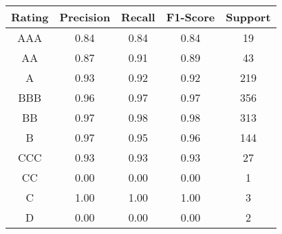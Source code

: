 \footnotesize
\begin{tabular}{ccccc}
\toprule
Rating & Precision & Recall & F1-Score & Support \\
\midrule
AAA & 0.84 & 0.84 & 0.84 & 19 \\
AA & 0.87 & 0.91 & 0.89 & 43 \\
A & 0.93 & 0.92 & 0.92 & 219 \\
BBB & 0.96 & 0.97 & 0.97 & 356 \\
BB & 0.97 & 0.98 & 0.98 & 313 \\
B & 0.97 & 0.95 & 0.96 & 144 \\
CCC & 0.93 & 0.93 & 0.93 & 27 \\
CC & 0.00 & 0.00 & 0.00 & 1 \\
C & 1.00 & 1.00 & 1.00 & 3 \\
D & 0.00 & 0.00 & 0.00 & 2 \\
\bottomrule
\end{tabular}

\normalsize